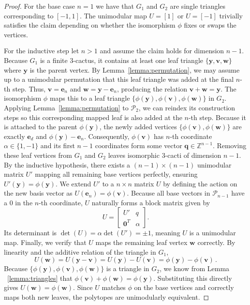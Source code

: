 \documentclass[a4paper,11pt,reqno]{amsart}
\begin{document}
\begin{proof}
For the base case $n=1$ we have that $G_1$ and $G_2$ are single triangles corresponding to $[-1, 1]$. The unimodular map 
$U = [1]$ or $U = [-1]$ trivially satisfies the claim depending on whether the isomorphism $\phi$ fixes or swaps the vertices.
		
For the inductive step let $n>1$ and assume the claim holds for dimension $n-1$. Because $G_1$ is a finite $3$-cactus, 
it contains at least one leaf triangle $\{\bm{y}, \bm{v}, \bm{w}\}$ where $\bm{y}$ is the parent vertex. 
By Lemma~\ref{lemma:permutation}, we may assume up to a unimodular permutation that this leaf triangle was added at the final 
$n$-th step. Thus, $\bm{v} = \bm{e}_n$ and $\bm{w} = \bm{y}-\bm{e}_n$, producing the relation $\bm{v} + \bm{w} = \bm{y}$. 
The isomorphism $\phi$ maps this to a leaf triangle $\{\phi(\bm{y}), \phi(\bm{v}), \phi(\bm{w})\}$ in $G_2$. 
Applying Lemma~\ref{lemma:permutation} to $\mathcal{P}_2$, we can reindex its construction steps so this corresponding 
mapped leaf is also added at the $n$-th step. Because it is attached to the parent $\phi(\bm{y})$, the newly added vertices 
$\{\phi(\bm{v}), \phi(\bm{w})\}$ are exactly $\bm{e}_d$ and $\phi(\bm{y}) -\bm{e}_n$. Consequently, $\phi(\bm{v})$ has $n$-th 
coordinate $\alpha \in \{1, -1\}$ and its first $n-1$ coordinates form some vector $\bm{q} \in \mathbb{Z}^{n-1}$. 
Removing these leaf vertices from $G_1$ and $G_2$ leaves isomorphic $3$-cacti of dimension $n-1$. By the inductive hypothesis, 
there exists a $(n-1) \times (n-1)$ unimodular matrix $U'$ mapping all remaining base vertices perfectly, ensuring $U'(\bm{y})  = \phi(\bm{y})$. 
We extend $U'$ to a $n \times n$ matrix $U$ by defining the action on the new basis vector as $U(\bm{e}_n) = \phi(\bm{v})$. 
Because all base vectors in $\mathcal{P}_{n-1}$ have a $0$ in the $n$-th coordinate, $U$ naturally forms a block matrix given by
\[
U = \begin{bmatrix} 
U' & q \\ 
\mathbf{0}^T & \alpha
\end{bmatrix}.
\]
Its determinant is $\det(U) = \alpha \det(U') = \pm 1$, meaning $U$ is a unimodular map. Finally, we verify that $U$ maps the 
remaining leaf vertex $\bm{w}$ correctly. By linearity and the additive relation of the triangle in $G_1$,
\[
U(\bm{w}) = U(\bm{y} - \bm{v}) = U(\bm{y}) - U(\bm{v}) = \phi(\bm{y}) - \phi(\bm{v})\,.
\]
Because $\{\phi(\bm{y}), \phi(\bm{v}), \phi(\bm{w})\}$ is a triangle in $G_2$, we know from Lemma ~\ref{lemma:triangles} that 
$\phi(\bm{v}) + \phi(\bm{w}) = \phi(\bm{y})$. Substituting this directly gives $U(\bm{w}) = \phi(\bm{w})$. Since $U$ matches 
$\phi$ on the base vertices and correctly maps both new leaves, the polytopes are unimodularly equivalent.
\end{proof}
\end{document}
